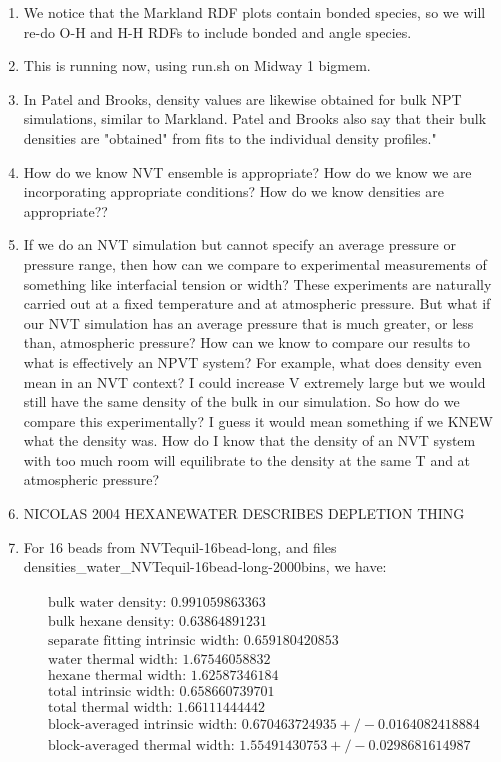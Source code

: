 \documentclass[12pt,reqno]{amsart}
\numberwithin{equation}{section}
\begin{document}
\begin{enumerate}
\item We notice that the Markland RDF plots contain bonded species, so we will re-do O-H and H-H RDFs to include bonded and angle species.  
\item This is running now, using run.sh on Midway 1 bigmem.    
\item In Patel and Brooks, density values are likewise obtained for bulk NPT simulations, similar to Markland.  Patel and Brooks also say that their bulk densities are "obtained" from fits to the individual density profiles."  
\item How do we know NVT ensemble is appropriate?  How do we know we are incorporating appropriate conditions?  How do we know densities are appropriate??
\item If we do an NVT simulation but cannot specify an average pressure or pressure range, then how can we compare to experimental measurements of something like interfacial tension or width?  These experiments are naturally carried out at a fixed temperature and at atmospheric pressure.  But what if our NVT simulation has an average pressure that is much greater, or less than, atmospheric pressure?  How can we know to compare our results to what is effectively an NPVT system?  For example, what does density even mean in an NVT context?  I could increase V extremely large but we would still have the same density of the bulk in our simulation.  So how do we compare this experimentally?  I guess it would mean something if we KNEW what the density was.  How do I know that the density of an NVT system with too much room will equilibrate to the density at the same T and at atmospheric pressure?
\item NICOLAS 2004 HEXANEWATER DESCRIBES DEPLETION THING  
\item For 16 beads from NVTequil-16bead-long, and files densities\_water\_NVTequil-16bead-long-2000bins, we have:


\begin{align}
\begin{split}
\text{bulk water density: } 0.991059863363 \\
\text{bulk hexane density: } 0.63864891231 \\
\text{separate fitting intrinsic width: } 0.659180420853 \\
\text{water thermal width: } 1.67546058832 \\
\text{hexane thermal width: } 1.62587346184 \\
\text{total intrinsic width: } 0.658660739701 \\
\text{total thermal width: } 1.66111444442 \\
\text{block-averaged intrinsic width: } 0.670463724935  +/- 0.0164082418884\\
\text{block-averaged thermal width: } 1.55491430753  +/- 0.0298681614987 \\
\end{split}
\end{align} 

\end{enumerate}
\end{document}
